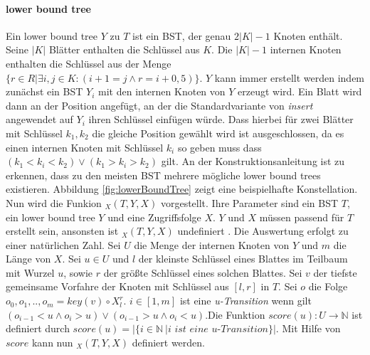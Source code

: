 \documentclass[a4paper,12pt]{article}
\begin{document}
\paragraph{lower bound tree} \label{wilberLowerBoundTree}
Ein lower bound tree $Y$ zu $T$ ist ein BST, der genau $2 \vert K\vert  - 1$ Knoten enthält. Seine $\vert K \vert$ Blätter enthalten die Schlüssel aus $K$. Die $\vert K \vert - 1$ internen Knoten enthalten die Schlüssel aus der Menge $\{r \in R \vert \exists i,j \in K \colon \left( i + 1 = j \land r = i + 0,5\right)\}$. $Y$ kann immer erstellt werden indem zunächst ein BST $Y_i$ mit den internen Knoten von $Y$ erzeugt wird. Ein Blatt wird dann an der Position angefügt, an der die Standardvariante von \textit{insert} angewendet auf $Y_i$ ihren Schlüssel einfügen würde. Dass hierbei für zwei Blätter mit Schlüssel $k_1, k_2$ die gleiche Position gewählt wird ist ausgeschlossen, da es einen internen Knoten mit Schlüssel $k_i$ so geben muss dass $\left(k_1 < k_i < k_2\right) \lor \left(k_1 > k_i > k_2 \right)$ gilt. An der Konstruktionsanleitung ist zu erkennen, dass zu den meisten BST mehrere mögliche lower bound trees existieren. Abbildung \ref{fig:lowerBoundTree} zeigt eine beispielhafte Konstellation. \\


        

\noindent Nun wird die Funkion $_X(T, Y, X) $ vorgestellt. Ihre Parameter sind ein BST $T$, ein lower bound tree $Y$ und eine Zugriffsfolge $X$. $Y$ und $X$ müssen passend für $T$ erstellt sein, ansonsten ist $_X(T, Y, X) $ undefiniert . Die Auswertung erfolgt zu einer natürlichen Zahl. Sei $U$ die Menge der internen Knoten von $Y$ und $m$ die Länge von $X$. Sei $u \in U$ und $l$ der kleinste Schlüssel eines Blattes im Teilbaum mit Wurzel $u$, sowie $r$ der größte Schlüssel eines solchen Blattes. Sei $v$ der tiefste gemeinsame Vorfahre der Knoten mit Schlüssel aus $\left[l, r\right]$  in $T$. Sei $o$ die Folge $o_0, o_1,..,o_m =  \mathit{key}(v) \circ X^r_l$. $i \in \left[1,m\right]$ ist eine \textit{u-Transition} wenn gilt $\left( o_{i-1} < u \land o_i > u \right) \lor \left( o_{i-1} > u \land o_i < u \right)$.Die Funktion $\mathit{score}\left(u\right) \colon U \rightarrow \mathbb{N}$ ist definiert durch $\mathit{score}\left(u\right) = \vert\{i \in \mathbb{N}\ \vert \textit{i ist eine u-Transition}\} \vert$. Mit Hilfe von $\mathit{score}$ kann nun  $_X(T, Y, X) $ definiert werden.
\end{document}
